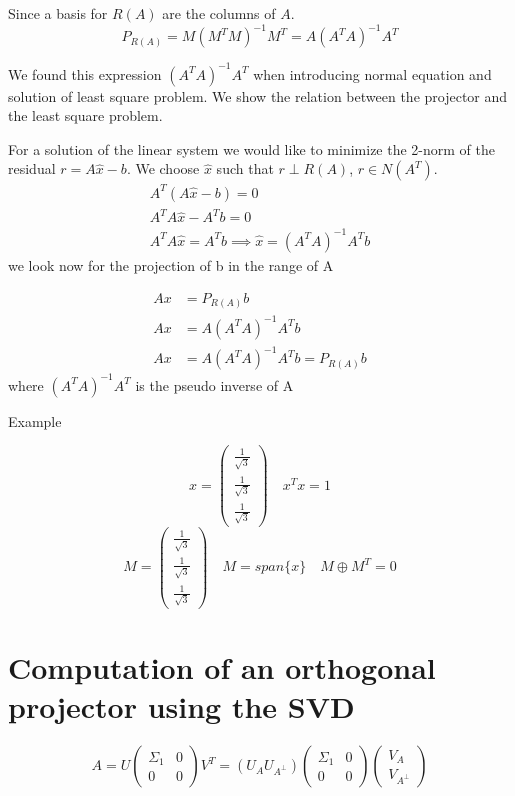 Since a basis for $R(A)$ are the columns of $A$.
$$ P_{R(A)} = M(M^TM)^{-1}M^T = A(A^TA)^{-1}A^T$$

We found this expression $(A^TA)^{-1}A^T$ when introducing normal equation and solution of least square problem.
We show the relation between the projector and the least square problem.

For a solution of the linear system we would like to minimize the 2-norm of the residual $r = A\hat{x} - b$.
We choose $\hat{x}$ such that $r \perp R(A)$, $r \in N(A^T)$.
$$
\begin{aligned}
    A^T(A\hat{x} - b) = 0 \\
    A^TA\hat{x} - A^Tb = 0 \\
    A^TA\hat{x} = A^Tb \implies \hat{x} = (A^TA)^{-1}A^Tb    
\end{aligned}
$$
we look now for the projection of b in the range of A


$$
\begin{aligned}
Ax &= P_{R(A)}b \\
Ax &= A(A^TA)^{-1}A^Tb \\
Ax &= A(A^TA)^{-1}A^Tb = P_{R(A)}b
\end{aligned}
$$
where $(A^TA)^{-1}A^T$ is the pseudo inverse of A

Example

$$
x = \begin{pmatrix}
    \frac{1}{\sqrt{3}} \\
    \frac{1}{\sqrt{3}} \\
    \frac{1}{\sqrt{3}}
\end{pmatrix} \quad
x^Tx = 1
$$
$$
M = \begin{pmatrix}
    \frac{1}{\sqrt{3}} \\
    \frac{1}{\sqrt{3}} \\
    \frac{1}{\sqrt{3}}
\end{pmatrix} \quad M = span\{x\} \quad M \oplus M^T = 0
$$


\section{Computation of an orthogonal projector using the SVD}
$$
A = U\begin{pmatrix}
    \Sigma_1 & 0 \\
    0 & 0
\end{pmatrix}V^T
= (U_A U_{A^{\perp}})\begin{pmatrix}
    \Sigma_1 & 0 \\
    0 & 0
\end{pmatrix}
\begin{pmatrix}
 V_A \\
 V_{A^{\perp}}
\end{pmatrix}
$$


